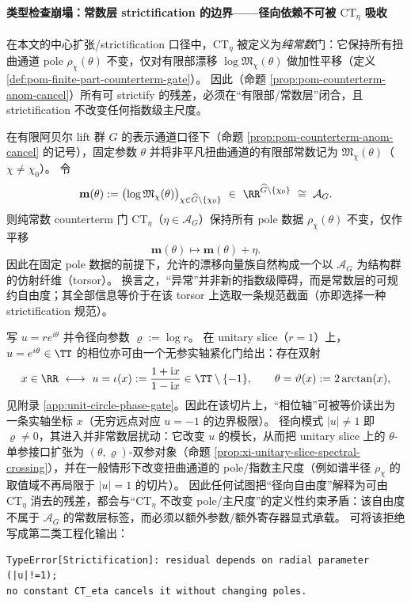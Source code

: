 \paragraph{类型检查崩塌：常数层 strictification 的边界——径向依赖不可被 \texorpdfstring{$\mathrm{CT}_\eta$}{CT} 吸收}
在本文的中心扩张/strictification 口径中，\(\mathrm{CT}_\eta\) 被定义为\emph{纯常数}门：它保持所有扭曲通道 pole \(\rho_\chi(\theta)\) 不变，仅对有限部漂移 \(\log\mathfrak{M}_\chi(\theta)\) 做加性平移（定义 \ref{def:pom-finite-part-counterterm-gate}）。
因此（命题 \ref{prop:pom-counterterm-anom-cancel}）所有可 strictify 的残差，必须在“有限部/常数层”闭合，且 strictification 不改变任何指数级主尺度。
\begin{remark}\label{rem:xi-finite-part-drift-torsor}
在有限阿贝尔 lift 群 \(G\) 的表示通道口径下（命题 \ref{prop:pom-counterterm-anom-cancel} 的记号），固定参数 \(\theta\) 并将非平凡扭曲通道的有限部常数记为 \(\mathfrak{M}_\chi(\theta)\)（\(\chi\neq\chi_0\)）。
令
\[
\mathbf{m}(\theta):=\bigl(\log\mathfrak{M}_\chi(\theta)\bigr)_{\chi\in\widehat G\setminus\{\chi_0\}}
\ \in\ \RR^{\widehat G\setminus\{\chi_0\}}\ \cong\ \mathcal{A}_G.
\]
则纯常数 counterterm 门 \(\mathrm{CT}_\eta\)（\(\eta\in\mathcal{A}_G\)）保持所有 pole 数据 \(\rho_\chi(\theta)\) 不变，仅作平移
\[
\mathbf{m}(\theta)\longmapsto \mathbf{m}(\theta)+\eta.
\]
因此在固定 pole 数据的前提下，允许的漂移向量族自然构成一个以 \(\mathcal{A}_G\) 为结构群的仿射纤维（torsor）。
换言之，“异常”并非新的指数级障碍，而是常数层的可规约自由度；其全部信息等价于在该 torsor 上选取一条规范截面（亦即选择一种 strictification 规范）。
\end{remark}


\par
写 \(u=re^{i\theta}\) 并令径向参数 \(\varrho:=\log r\)。
在 unitary slice（\(r=1\)）上，\(u=e^{i\theta}\in\TT\) 的相位亦可由一个无参实轴紧化门给出：存在双射
\[
x\in\RR\ \longleftrightarrow\ u=\iota(x):=\frac{1+\mathrm{i}x}{1-\mathrm{i}x}\in\TT\setminus\{-1\},
\qquad
\theta=\vartheta(x):=2\arctan(x),
\]
见附录 \ref{app:unit-circle-phase-gate}。因此在该切片上，“相位轴”可被等价读出为一条实轴坐标 \(x\)（无穷远点对应 \(u=-1\) 的边界极限）。
径向模式 \(|u|\neq 1\) 即 \(\varrho\neq 0\)，其进入并非常数层扰动：它改变 \(u\) 的模长，从而把 unitary slice 上的 \(\theta\)-单参接口扩张为 \((\theta,\varrho)\)-双参对象（命题 \ref{prop:xi-unitary-slice-spectral-crossing}），并在一般情形下改变扭曲通道的 pole/指数主尺度（例如谱半径 \(\rho_\chi\) 的取值域不再局限于 \(|u|=1\) 的切片）。
因此任何试图把“径向自由度”解释为可由 \(\mathrm{CT}_\eta\) 消去的残差，都会与“\(\mathrm{CT}_\eta\) 不改变 pole/主尺度”的定义性约束矛盾：该自由度不属于 \(\mathcal{A}_G\) 的常数层标签，而必须以额外参数/额外寄存器显式承载。
可将该拒绝写成第二类工程化输出：
\begin{verbatim}
TypeError[Strictification]: residual depends on radial parameter (|u|!=1);
no constant CT_eta cancels it without changing poles.
\end{verbatim}

